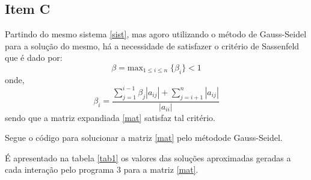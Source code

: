 \documentclass[a4paper,11pt, twoside]{article}
\begin{document}
    \subsection*{Item C}
    Partindo do mesmo sistema \eqref{sist}, mas agoro utilizando o método de Gauss-Seidel
    para a solução do mesmo, há a necessidade de satisfazer o critério de Sassenfeld que é
    dado por:
    \begin{equation}
        \beta = \mathrm{max}_{1 \le i \le n} \;\{\beta_i\} < 1
    \end{equation}
    onde,
    \[
        \beta_i = \frac{\sum^{i - 1}_{j = 1}\beta_j|a_{ij}| + \sum^n_{j = i + 1}|a_{ij}|}{|a_{ii}|}
    \]
    sendo que a matriz expandiada \eqref{mat} satisfaz tal critério.
    
    Segue o código para solucionar a matriz \eqref{mat} pelo métodode Gauss-Seidel.
    
    {\linespread{1.15}
    }
    \newpage
    É apresentado na tabela \ref{tab1} os valores das soluções aproximadas geradas a cada interação pelo programa 3 para a matriz \eqref{mat}.
\end{document}

